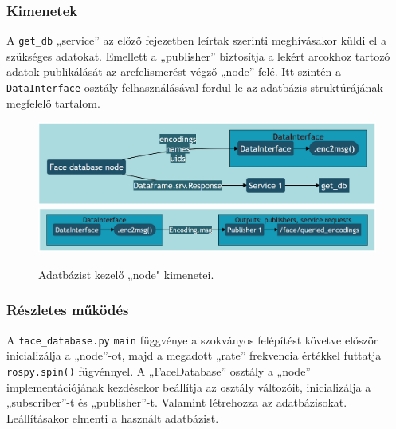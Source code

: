 \subsubsection{Kimenetek}
A \verb|get_db| „service” az előző fejezetben leírtak szerinti meghívásakor küldi el a szükséges adatokat. Emellett a „publisher” biztosítja a lekért arcokhoz tartozó adatok publikálását az arcfelismerést végző „node” felé. Itt szintén a \verb|DataInterface| osztály felhasználásával fordul le az adatbázis struktúrájának megfelelő tartalom.
\begin{figure}[!ht]
    \centering
    \includegraphics[width=150mm, keepaspectratio]{02_mermaid/db_kimenet1.png}
    \includegraphics[width=150mm, keepaspectratio]{02_mermaid/db_kimenet2.png}
    \caption{Adatbázist kezelő „node" kimenetei.}
    \label{fig:dbo}
\end{figure}

\subsubsection{Részletes működés}
A \verb|face_database.py| \verb|main| függvénye a szokványos felépítést követve először inicializálja a „node”-ot, majd a megadott „rate” frekvencia értékkel futtatja \verb|rospy.spin()| fügvénnyel. A „FaceDatabase” osztály a „node” implementációjának kezdésekor beállítja az osztály változóit, inicializálja a „subscriber”-t és „publisher”-t. Valamint létrehozza az adatbázisokat. Leállításakor elmenti a használt adatbázist.

